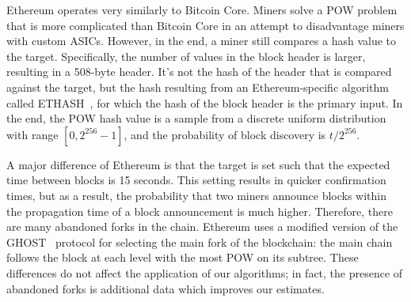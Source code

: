  Ethereum operates very similarly to Bitcoin Core. Miners solve a POW problem that is more complicated
than Bitcoin Core in an attempt to disadvantage miners with custom ASICs.
However, in the end, a miner still compares a hash value to the target.
Specifically, the number of values in the block header is larger,
resulting in a 508-byte header. It's not the hash of the header that
is compared against the target, but the hash resulting from an
Ethereum-specific algorithm called ETHASH~\cite{ETHASH}, for which the
hash of the block header is the primary input. In the end, the POW
hash value is a sample from a discrete uniform distribution with range
$[0,2^{256}-1]$, and the probability of block discovery is
${t/2^{256}}$.

A major difference of Ethereum is that the target is set such that the
expected time between blocks is 15 seconds. This setting results
in quicker confirmation times, but as a result, the probability that two
miners announce blocks within the propagation time of a block
announcement is much higher. Therefore, there are many abandoned
forks in the chain. Ethereum uses a modified version of the GHOST~\cite{Sompolinsky:2015}
protocol for selecting the main fork of the blockchain: the main chain
follows the block at each level with the most POW on its subtree.
These differences do not affect the application of our algorithms; in
fact, the presence of abandoned forks is additional data which improves our
estimates.


